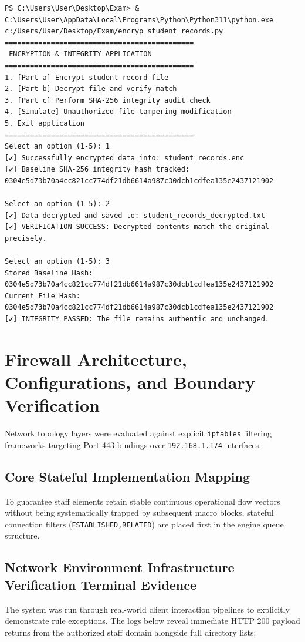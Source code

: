 \documentclass[11pt,a4paper]{article}
\begin{document}
\begin{lstlisting}[text, caption={Cryptographic Execution Evidence}]
PS C:\Users\User\Desktop\Exam> & C:\Users\User\AppData\Local\Programs\Python\Python311\python.exe c:/Users/User/Desktop/Exam/encryp_student_records.py
=============================================
 ENCRYPTION & INTEGRITY APPLICATION 
=============================================
1. [Part a] Encrypt student record file
2. [Part b] Decrypt file and verify match
3. [Part c] Perform SHA-256 integrity audit check
4. [Simulate] Unauthorized file tampering modification
5. Exit application
=============================================
Select an option (1-5): 1
[✔] Successfully encrypted data into: student_records.enc
[✔] Baseline SHA-256 integrity hash tracked: 0304e5d73b70a4cc821cc774df21db6614a987c30dcb1cdfea135e2437121902

Select an option (1-5): 2
[✔] Data decrypted and saved to: student_records_decrypted.txt
[✔] VERIFICATION SUCCESS: Decrypted contents match the original precisely.

Select an option (1-5): 3
Stored Baseline Hash: 0304e5d73b70a4cc821cc774df21db6614a987c30dcb1cdfea135e2437121902
Current File Hash:    0304e5d73b70a4cc821cc774df21db6614a987c30dcb1cdfea135e2437121902
[✔] INTEGRITY PASSED: The file remains authentic and unchanged.
\end{lstlisting}

\section{Firewall Architecture, Configurations, and Boundary Verification}
Network topology layers were evaluated against explicit \texttt{iptables} filtering frameworks targeting Port 443 bindings over \texttt{192.168.1.174} interfaces.

\subsection{Core Stateful Implementation Mapping}
To guarantee staff elements retain stable continuous operational flow vectors without being systematically trapped by subsequent macro blocks, stateful connection filters (\texttt{ESTABLISHED,RELATED}) are placed first in the engine queue structure.

\subsection{Network Environment Infrastructure Verification Terminal Evidence}
The system was run through real-world client interaction pipelines to explicitly demonstrate rule exceptions. The logs below reveal immediate HTTP 200 payload returns from the authorized staff domain alongside full directory lists:
\end{document}
